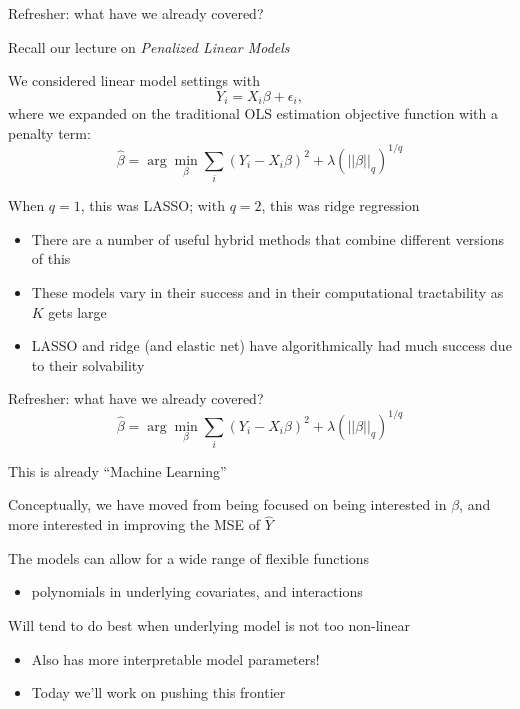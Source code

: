 \documentclass[notes,11pt, aspectratio=169]{beamer}
\newenvironment{wideitemize}{\itemize\addtolength{\itemsep}{10pt}}{\enditemize}
\begin{document}
\begin{frame}{Refresher: what have we already covered?}
  \begin{wideitemize}
  \item Recall our lecture on \emph{Penalized Linear Models}
  \item We considered linear model settings with
    $$ Y_{i} = X_{i}\beta + \epsilon_{i},$$
    where we expanded on the traditional OLS estimation objective function with a penalty term:
    $$\hat{\beta} = \arg\min_{\beta} \sum_{i}(Y_{i} - X_{i}\beta)^{2} + \lambda  (||\beta||_{q})^{1/q}$$
  \item When $q = 1$, this was LASSO; with $q=2$, this was ridge regression
    \begin{itemize}
    \item There are a number of useful hybrid methods that combine different versions of this
    \item These models vary in their success and in their computational tractability as $K$ gets large
    \item LASSO and ridge (and elastic net) have algorithmically had much success due to their solvability
    \end{itemize}
  \end{wideitemize}
\end{frame}

\begin{frame}{Refresher: what have we already covered?}
    $$\hat{\beta} = \arg\min_{\beta} \sum_{i}(Y_{i} - X_{i}\beta)^{2} + \lambda  (||\beta||_{q})^{1/q}$$  
    \begin{wideitemize}
    \item This is already ``Machine Learning''
    \item Conceptually, we have moved from being focused on being
      interested in $\beta$, and more interested in improving the MSE
      of $\hat{Y}$
    \item The models can allow for a wide range of flexible functions
      \begin{itemize}
      \item polynomials in underlying covariates, and interactions
      \end{itemize}
    \item Will tend to do best when underlying model is not too non-linear
      \begin{itemize}
      \item Also has more interpretable model parameters!
      \item Today we'll work on pushing this frontier
      \end{itemize}
  \end{wideitemize}
\end{frame}
\end{document}
